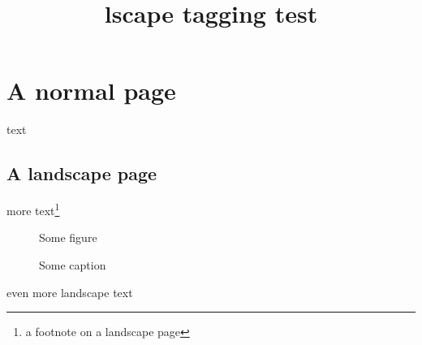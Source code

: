\documentclass{article}
\title{lscape tagging test}
\begin{document}
\section{A normal page}
text

\begin{landscape}
\section{A landscape page}
more text\footnote{a footnote on a landscape page}
\begin{figure}
\centering
Some figure
\caption{Some caption}
\end{figure}

\newpage

even more landscape text
\end{landscape}
\end{document}
